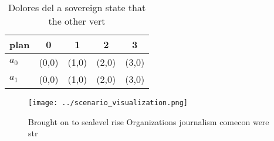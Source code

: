 \documentclass[a4paper]{article}
\begin{document}
\begin{table}
\begin{adjustbox}{width=0.7\columnwidth}
\begin{tabular}{|l|l|l|l|l|}
\hline
\textbf{plan} & \multicolumn{1}{c|}{\textbf{0}} & \multicolumn{1}{c|}{\textbf{1}} & \multicolumn{1}{c|}{\textbf{2}} & \multicolumn{1}{c|}{\textbf{3}} \\ \hline
\textbf{$a_0$}  & (0,0) & (1,0) & (2,0) & (3,0) \\ \hline
\textbf{$a_1$}  & (0,0) & (1,0) & (2,0) & (3,0) \\ \hline
\end{tabular}
\end{adjustbox}
\caption{Dolores del a sovereign state that the other vert
}
\end{table}

\begin{figure}
\centering
\texttt{[image: ../scenario\_visualization.png]}
\caption{Brought on to sealevel rise Organizations journalism comecon were str
}
\end{figure}
 
\end{document}
